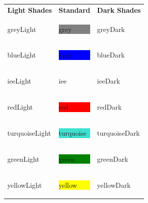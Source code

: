 \documentclass[11pt,a4paper]{report}
\begin{document}
\vspace{0.1cm}
\begin{tabularx}{\textwidth}{@{}>{\centering\arraybackslash}X >{\centering\arraybackslash}X >{\centering\arraybackslash}X@{}}
\textbf{Light Shades} & \textbf{Standard} & \textbf{Dark Shades} \\[0.3em]

\colorbox{greyLight}{\parbox[c][1.2em][c]{\linewidth}{\centering\color{greyDark} greyLight}} &
\colorbox{grey}{\parbox[c][1.2em][c]{\linewidth}{\centering\color{white} grey}} &
\colorbox{greyDark}{\parbox[c][1.2em][c]{\linewidth}{\centering\color{white} greyDark}} \\[0.3em]

\colorbox{blueLight}{\parbox[c][1.2em][c]{\linewidth}{\centering\color{blueDark} blueLight}} &
\colorbox{blue}{\parbox[c][1.2em][c]{\linewidth}{\centering\color{white} blue}} &
\colorbox{blueDark}{\parbox[c][1.2em][c]{\linewidth}{\centering\color{white} blueDark}} \\[0.3em]

\colorbox{ieeLight}{\parbox[c][1.2em][c]{\linewidth}{\centering\color{ieeDark} ieeLight}} &
\colorbox{iee}{\parbox[c][1.2em][c]{\linewidth}{\centering\color{white} iee}} &
\colorbox{ieeDark}{\parbox[c][1.2em][c]{\linewidth}{\centering\color{white} ieeDark}} \\[0.3em]

\colorbox{redLight}{\parbox[c][1.2em][c]{\linewidth}{\centering\color{redDark} redLight}} &
\colorbox{red}{\parbox[c][1.2em][c]{\linewidth}{\centering\color{white} red}} &
\colorbox{redDark}{\parbox[c][1.2em][c]{\linewidth}{\centering\color{white} redDark}} \\[0.3em]

\colorbox{turquoiseLight}{\parbox[c][1.2em][c]{\linewidth}{\centering\color{turquoiseDark} turquoiseLight}} &
\colorbox{turquoise}{\parbox[c][1.2em][c]{\linewidth}{\centering\color{white} turquoise}} &
\colorbox{turquoiseDark}{\parbox[c][1.2em][c]{\linewidth}{\centering\color{white} turquoiseDark}} \\[0.3em]

\colorbox{greenLight}{\parbox[c][1.2em][c]{\linewidth}{\centering\color{greenDark} greenLight}} &
\colorbox{green}{\parbox[c][1.2em][c]{\linewidth}{\centering\color{white} green}} &
\colorbox{greenDark}{\parbox[c][1.2em][c]{\linewidth}{\centering\color{white} greenDark}} \\[0.3em]

\colorbox{yellowLight}{\parbox[c][1.2em][c]{\linewidth}{\centering\color{yellowDark} yellowLight}} &
\colorbox{yellow}{\parbox[c][1.2em][c]{\linewidth}{\centering\color{white} yellow}} &
\colorbox{yellowDark}{\parbox[c][1.2em][c]{\linewidth}{\centering\color{white} yellowDark}} \\
\end{tabularx}
\end{document}
